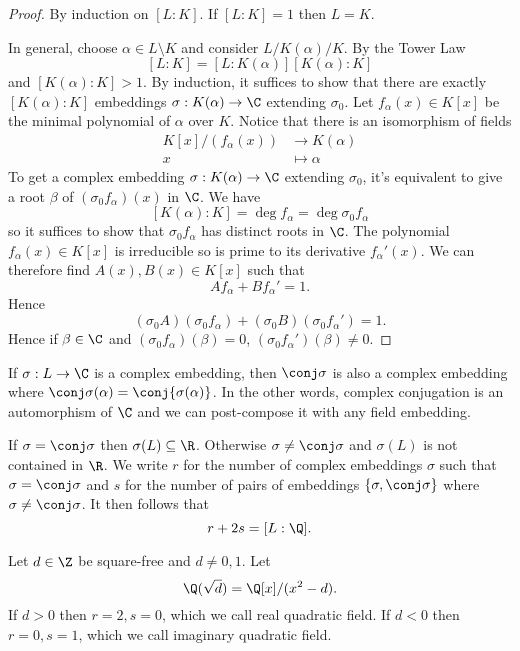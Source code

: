 \documentclass[a4paper]{article}
\begin{document}
\begin{proof}
  By induction on \([L:K]\). If \([L:K] = 1\) then \(L = K\).

  In general, choose \(\alpha \in L \setminus K\) and consider \(L/K(\alpha)/K\). By the Tower Law
  \[
    [L:K] = [L:K(\alpha)][K(\alpha):K]
  \]
  and \([K(\alpha):K] > 1\). By induction, it suffices to show that there are exactly \([K(\alpha):K]\) embeddings \(\sigma: K(\alpha) \to \C\) extending \(\sigma_0\). Let \(f_\alpha(x) \in K[x]\) be the minimal polynomial of \(\alpha\) over \(K\). Notice that there is an isomorphism of fields
  \begin{align*}
    K[x]/(f_\alpha(x)) &\to K(\alpha) \\
    x &\mapsto \alpha
  \end{align*}
  To get a complex embedding \(\sigma: K(\alpha) \to \C\) extending \(\sigma_0\), it's equivalent to give a root \(\beta\) of \((\sigma_0f_\alpha)(x)\) in \(\C\). We have
  \[
    [K(\alpha):K] = \deg f_\alpha = \deg \sigma_0f_\alpha
  \]
  so it suffices to show that \(\sigma_0f_\alpha\) has distinct roots in \(\C\). The polynomial \(f_\alpha(x) \in K[x]\) is irreducible so is prime to its derivative \(f_\alpha'(x)\). We can therefore find \(A(x), B(x) \in K[x]\) such that
  \[
    Af_\alpha + Bf_\alpha' = 1.
  \]
  Hence
  \[
    (\sigma_0 A)(\sigma_0f_\alpha) + (\sigma_0B)(\sigma_0f_\alpha') = 1.
  \]
  Hence if \(\beta \in \C\) and \((\sigma_0f_\alpha)(\beta) = 0\), \((\sigma_0f_\alpha')(\beta) \neq 0\).
\end{proof}

\begin{notation}
  If \(\sigma: L \to \C\) is a complex embedding, then \(\conj \sigma\) is also a complex embedding where \(\conj \sigma(\alpha) = \conj{\sigma(\alpha)}\). In the other words, complex conjugation is an automorphism of \(\C\) and we can post-compose it with any field embedding.

  If \(\sigma = \conj \sigma\) then \(\sigma(L) \subseteq \R\). Otherwise \(\sigma \neq \conj \sigma\) and \(\sigma(L)\) is not contained in \(\R\). We write \(r\) for the number of complex embeddings \(\sigma\) such that \(\sigma = \conj \sigma\) and \(s\) for the number of pairs of embeddings \(\{\sigma, \conj \sigma\}\) where \(\sigma \neq \conj \sigma\). It then follows that
  \[
    r + 2s = [L:\Q].
  \]
\end{notation}

\begin{eg}
  Let \(d \in \Z\) be square-free and \(d \neq 0, 1\). Let\
  \[
    \Q(\sqrt d) = \Q[x]/(x^2 - d).
  \]
  If \(d > 0\) then \(r = 2, s = 0\), which we call real quadratic field. If \(d < 0\) then \(r = 0, s = 1\), which we call imaginary quadratic field.
\end{eg}
\end{document}
